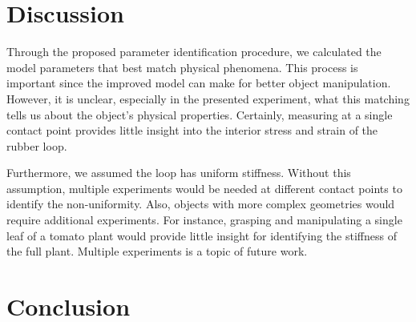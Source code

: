 \documentclass[letterpaper, 10pt, conference]{ieeeconf}
\begin{document}
\section{Discussion}
Through the proposed parameter identification procedure, we calculated the model parameters that best match physical phenomena.  This process is important since the improved model can make for better object manipulation.  However, it is unclear, especially in the presented experiment, what this matching tells us about the object's physical properties.  Certainly, measuring at a single contact point provides little insight into the interior stress and strain of the rubber loop.

Furthermore, we assumed the loop has uniform stiffness.  Without this assumption, multiple experiments would be needed at different contact points to identify the non-uniformity.  Also, objects with more complex geometries would require additional experiments.  For instance, grasping and manipulating a single leaf of a tomato plant would provide little insight for identifying the stiffness of the full plant.  Multiple experiments is a topic of future work.

\section{Conclusion}








\end{document}

